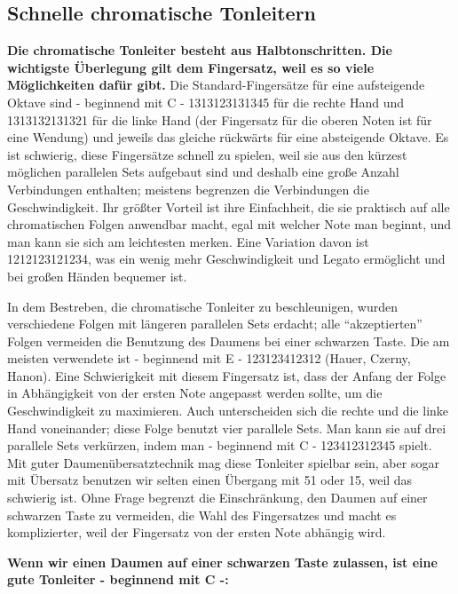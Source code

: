 \subsection{Schnelle chromatische Tonleitern}\hypertarget{c1iii5h}{}

\textbf{Die chromatische Tonleiter besteht aus Halbtonschritten.
Die wichtigste Überlegung gilt dem Fingersatz, weil es so viele Möglichkeiten dafür gibt.}
Die Standard-Fingersätze für eine aufsteigende Oktave sind - beginnend mit C - 1313123131345 für die rechte Hand und 1313132131321 für die linke Hand (der Fingersatz für die oberen Noten ist für eine Wendung) und jeweils das gleiche rückwärts für eine absteigende Oktave.
Es ist schwierig, diese Fingersätze schnell zu spielen, weil sie aus den kürzest möglichen parallelen Sets aufgebaut sind und deshalb eine große Anzahl Verbindungen enthalten; meistens begrenzen die Verbindungen die Geschwindigkeit. 
Ihr größter Vorteil ist ihre Einfachheit, die sie praktisch auf alle chromatischen Folgen anwendbar macht, egal mit welcher Note man beginnt, und man kann sie sich am leichtesten merken.
Eine Variation davon ist 1212123121234, was ein wenig mehr Geschwindigkeit und Legato ermöglicht und bei großen Händen bequemer ist.

In dem Bestreben, die chromatische Tonleiter zu beschleunigen, wurden verschiedene Folgen mit längeren parallelen Sets erdacht; alle \enquote{akzeptierten} Folgen vermeiden die Benutzung des Daumens bei einer schwarzen Taste.
Die am meisten verwendete ist - beginnend mit E - 123123412312 (Hauer, Czerny, Hanon).
Eine Schwierigkeit mit diesem Fingersatz ist, dass der Anfang der Folge in Abhängigkeit von der ersten Note angepasst werden sollte, um die Geschwindigkeit zu maximieren.
Auch unterscheiden sich die rechte und die linke Hand voneinander; diese Folge benutzt vier parallele Sets.
Man kann sie auf drei parallele Sets verkürzen, indem man - beginnend mit C - 123412312345 spielt.
Mit guter Daumenübersatztechnik mag diese Tonleiter spielbar sein, aber sogar mit Übersatz benutzen wir selten einen Übergang mit 51 oder 15, weil das schwierig ist.
Ohne Frage begrenzt die Einschränkung, den Daumen auf einer schwarzen Taste zu vermeiden, die Wahl des Fingersatzes und macht es komplizierter, weil der Fingersatz von der ersten Note abhängig wird.

\textbf{Wenn wir einen Daumen auf einer schwarzen Taste zulassen, ist eine gute Tonleiter - beginnend mit C -:}

